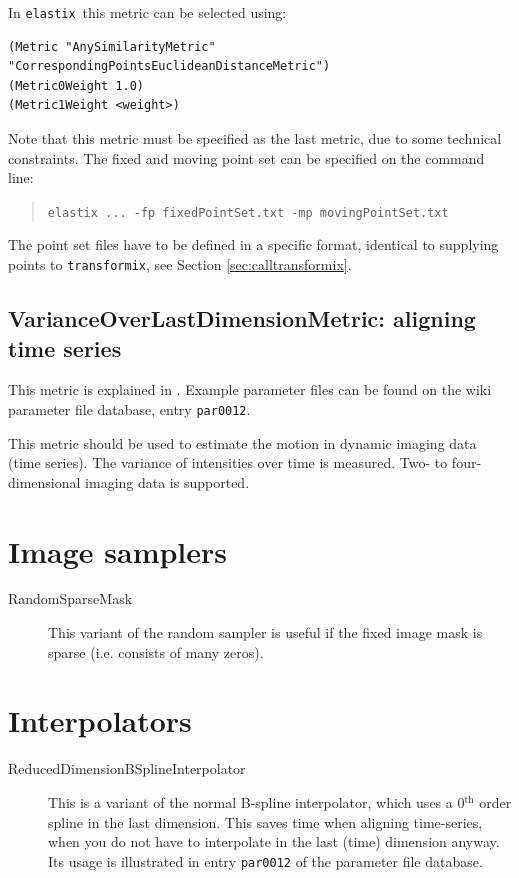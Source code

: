 \documentclass[]{report}
\newcommand{\elastix}{\texttt{elastix}}
\newcommand{\transformix}{\texttt{transformix}}
\begin{document}
In \elastix\ this metric can be selected using: \small
\begin{verbatim}
(Metric "AnySimilarityMetric" "CorrespondingPointsEuclideanDistanceMetric")
(Metric0Weight 1.0)
(Metric1Weight <weight>)
\end{verbatim}
\normalsize Note that this metric must be specified as the last
metric, due to some technical constraints. The fixed and moving
point set can be specified on the command line:
\begin{quote}
\texttt{elastix ... -fp fixedPointSet.txt -mp movingPointSet.txt}
\end{quote}
The point set files have to be defined in a specific format,
identical to supplying points to \transformix, see Section
\ref{sec:calltransformix}.

\subsection{VarianceOverLastDimensionMetric: aligning time series}

This metric is explained in \cite{Metz11}. Example parameter files can be found
on the wiki parameter file database, entry \texttt{par0012}.

This metric should be used to estimate the motion in dynamic imaging data (time
series). The variance of intensities over time is measured. Two- to
four-dimensional imaging data is supported.

\section{Image samplers}

\begin{description}
\item[RandomSparseMask] This variant of the random sampler is useful if the
    fixed image mask is sparse (i.e. consists of many zeros).
\end{description}

\section{Interpolators}

\begin{description}
\item[ReducedDimensionBSplineInterpolator] This is a variant of the normal
    B-spline interpolator, which uses a 0$^\text{th}$ order spline in the
    last dimension. This saves time when aligning time-series, when you do
    not have to interpolate in the last (time) dimension anyway. Its usage
    is illustrated in entry \texttt{par0012} of the parameter file
    database.
\end{description}
\end{document}
